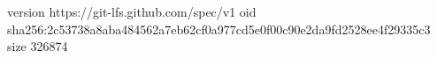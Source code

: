 version https://git-lfs.github.com/spec/v1
oid sha256:2c53738a8aba484562a7eb62cf0a977cd5e0f00c90e2da9fd2528ee4f29335c3
size 326874
